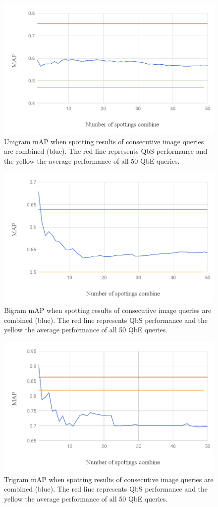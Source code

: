 \documentclass[ms,electronic,twosidetoc,letterpaper,chaptercenter,parttop,lof,lot]{byumsphd}
\begin{document}
\begin{figure}
    \centering
    \includegraphics[width=.75\textwidth]{unigram_respot_chart}
    \caption{Unigram mAP when spotting results of consecutive image queries are combined (blue). The red line represents QbS performance and the yellow the average performance of all 50 QbE queries.}
    \label{fig:unigram_respot}
\end{figure}
\begin{figure}
    \centering
    \includegraphics[width=.75\textwidth]{bigram_respot_chart}
    \caption{Bigram mAP when spotting results of consecutive image queries are combined (blue). The red line represents QbS performance and the yellow the average performance of all 50 QbE queries.}
    \label{fig:bigram_respot}
\end{figure}
\begin{figure}
    \centering
    \includegraphics[width=.75\textwidth]{trigram_respot_chart}
    \caption{Trigram mAP when spotting results of consecutive image queries are combined (blue). The red line represents QbS performance and the yellow the average performance of all 50 QbE queries.}
    \label{fig:trigram_respot}
\end{figure}
\end{document}
